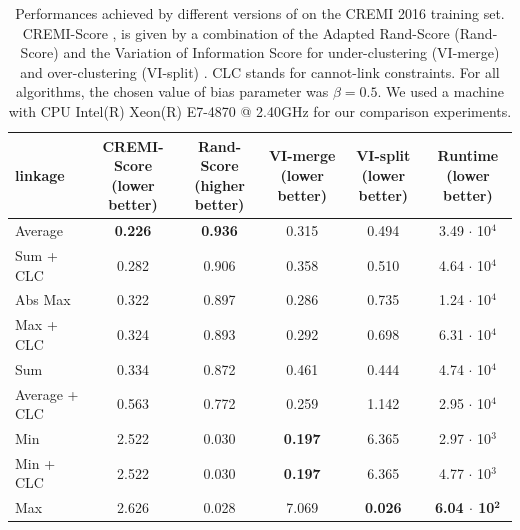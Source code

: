 \begin{table}[t]
\centering
    \scriptsize
        \begin{tabular}{l|c|c|c|c|c}
          \algname{} linkage & \makecell{CREMI-Score\\(lower better)}  & \makecell{Rand-Score\\(higher better)} & \makecell{VI-merge\\(lower better)} & \makecell{VI-split\\(lower better)} & \makecell{Runtime\\(lower better)} \\ \midrule
Average & \textbf{0.226} & \textbf{0.936} & 0.315 & 0.494 & 3.49 $\cdot$ 10$^4$ \\
Sum + CLC \cite{levinkov2017comparative} & 0.282 & 0.906 & 0.358 & 0.510 & 4.64 $\cdot$ 10$^4$ \\
Abs Max \cite{wolf2018mutex} & 0.322 & 0.897 & 0.286 & 0.735 & 1.24 $\cdot$ 10$^4$ \\
Max + CLC & 0.324 & 0.893 & 0.292 & 0.698 & 6.31 $\cdot$ 10$^4$ \\
Sum \cite{keuper2015efficient} & 0.334 & 0.872 & 0.461 & 0.444 & 4.74 $\cdot$ 10$^4$ \\
Average + CLC & 0.563 & 0.772 & 0.259  & 1.142 & 2.95 $\cdot$ 10$^4$ \\
Min & 2.522 & 0.030 & \textbf{0.197} & 6.365 & 2.97 $\cdot$ 10$^3$ \\
Min + CLC & 2.522 & 0.030 & \textbf{0.197}  & 6.365 & 4.77 $\cdot$ 10$^3$ \\
Max & 2.626 & 0.028 & 7.069 & \textbf{0.026} & \textbf{6.04 $\cdot$ 10$^\mathbf{2}$} \\
        \end{tabular}
        \vspace*{1.1em}
    \caption{Performances achieved by different versions of \algname{} on the CREMI 2016 training set. 
    CREMI-Score \cite{cremiChallenge}, is given by a combination of the Adapted Rand-Score (Rand-Score) and the Variation of Information Score for under-clustering (VI-merge) and over-clustering (VI-split) \cite{arganda2015crowdsourcing}.
    CLC stands for cannot-link constraints. For all algorithms, the chosen value of bias parameter was $\beta = 0.5$. We used a machine with CPU Intel(R) Xeon(R) E7-4870 @ 2.40GHz for our comparison experiments. }
    \label{tab:extended_results_cremi}
\end{table}


